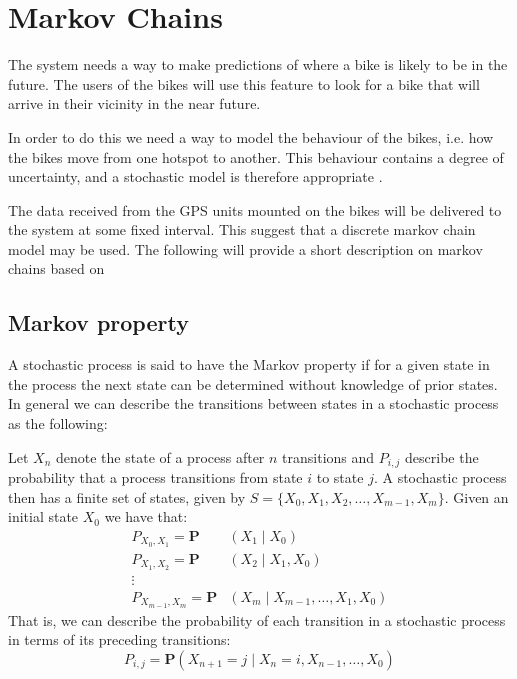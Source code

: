 \section{Markov Chains}\label{markov}
The system needs a way to make predictions of where a bike is likely to be in the future.
The users of the bikes will use this feature to look for a bike that will arrive in their vicinity in the near future.

In order to do this we need a way to model the behaviour of the bikes, i.e. how the bikes move from one hotspot to another.
This behaviour contains a degree of uncertainty, and a stochastic model is therefore appropriate \cite[p. ~296]{bertsekas2002introduction}.

The data received from the GPS units mounted on the bikes will be delivered to the system at some fixed interval.
This suggest that a discrete markov chain model may be used.
The following will provide a short description on markov chains based on \citet[chapter 7]{bertsekas2002introduction}

\subsection{Markov property}\label{markov:property}
A stochastic process is said to have the Markov property if for a given state in the process the next state can be determined without knowledge of prior states.
In general we can describe the transitions between states in a stochastic process as the following:

Let $X_n$ denote the state of a process after $n$ transitions and $P_{i,j}$ describe the probability that a process transitions from state $i$ to state $j$.
A stochastic process then has a finite set of states, given by $S = \{X_0, X_1, X_2,\dots, X_{m-1}, X_m\}$.
Given an initial state $X_0$ we have that:
\begin{align*}
P_{X_0,X_1} = \mathbf{P}&(X_1 \mid X_0)\\
P_{X_1,X_2} = \mathbf{P}&(X_2 \mid X_1, X_0)\\
\vdots\\
P_{X_{m-1},X_m} = \mathbf{P}&(X_m \mid X_{m-1}, \dots, X_1, X_0)
\end{align*}
That is, we can describe the probability of each transition in a stochastic process in terms of its preceding transitions:
\begin{equation}\label{markov:eq:stochastic_prob}
P_{i,j} = \mathbf{P}(X_{n+1} = j \mid X_n = i, X_{n-1}, \dots, X_0)
\end{equation}

